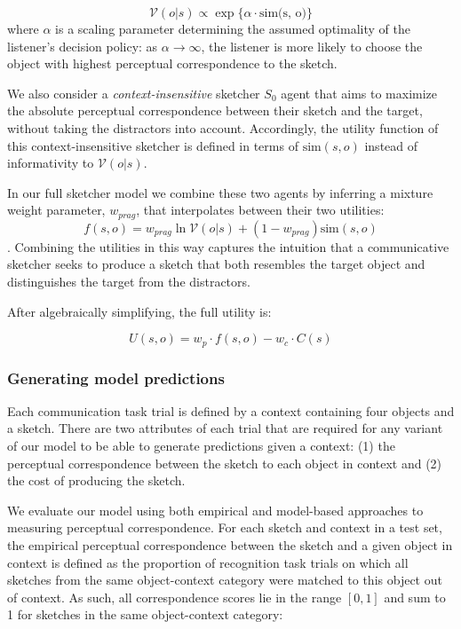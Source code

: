 \documentclass[9pt,twocolumn,twoside]{pnas-new}
\begin{document}
{\begin{equation} \label{literal_viewer_score}
\mathcal{V}(o|s) \propto \exp\{\alpha \cdot \textrm{sim(s, o)}\}
\end{equation}
where $\alpha$ is a scaling parameter determining the assumed optimality of the listener's decision policy: as $\alpha \rightarrow \infty$, the listener is more likely to choose the object with highest perceptual correspondence to the sketch.

We also consider a \textit{context-insensitive} sketcher $S_0$ agent that aims to maximize the absolute perceptual correspondence between their sketch and the target, without taking the  distractors into account. Accordingly, the utility function of this context-insensitive sketcher is defined in terms of $\textrm{sim}(s, o)$ instead of informativity to $\mathcal{V}(o|s)$.

In our full sketcher model we combine these two agents by inferring a mixture weight parameter, $w_{prag}$, that interpolates between their two utilities: $$f(s,o) = w_{prag}\ln \mathcal{V}(o | s) + (1-w_{prag}) \textrm{sim}(s,o)$$. Combining the utilities in this way captures the intuition that a communicative sketcher seeks to produce a sketch that both resembles the target object and distinguishes the target from the distractors.

After algebraically simplifying, the full utility is:

\begin{equation}
U(s,o) =  w_p \cdot  f(s,o) - w_c \cdot C(s)
\end{equation}

\subsubsection*{Generating model predictions}

Each communication task trial is defined by a context containing four objects and a sketch. There are two attributes of each trial that are required for any variant of our model to be able to generate predictions given a context: (1) the perceptual correspondence between the sketch to each object in context and (2) the cost of producing the sketch.

We evaluate our model using both empirical and model-based approaches to measuring perceptual correspondence. For each sketch and context in a test set, the empirical perceptual correspondence between the sketch and a given object in context is defined as the proportion of recognition task trials on which all sketches from the same object-context category were matched to this object out of context. As such, all correspondence scores lie in the range $[0,1]$ and sum to 1 for sketches in the same object-context category:

}
\end{document}

